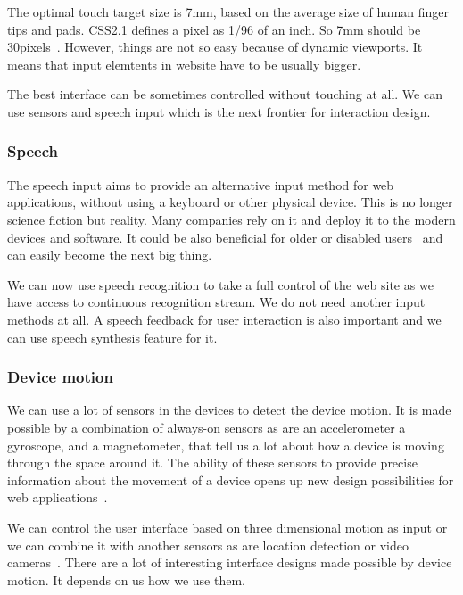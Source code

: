 \documentclass{iitsrc}
\begin{document}
The optimal touch target size is 7mm, based on the average size of human finger tips and pads. CSS2.1 defines a pixel as 1/96 of an inch. So 7mm should be 30pixels~\cite{designingfortouch}. However, things are not so easy because of dynamic viewports. It means that input elemtents in website have to be usually bigger.

The best interface can be sometimes controlled without touching at all. We can use sensors and speech input which is the next frontier for interaction design.


\subsubsection*{Speech} %
\label{sub:speech}

The speech input aims to provide an alternative input method for web applications, without using a keyboard or other physical device. This is no longer science fiction but reality. Many companies rely on it and deploy it to the modern devices and software. It could be also beneficial for older or disabled users~\cite{SpeechRecognition} and can easily become the next big thing.

We can now use speech recognition to take a full control of the web site as we have access to continuous recognition stream. We do not need another input methods at all. A speech feedback for user interaction is also important and we can use speech synthesis feature for it.


\subsubsection*{Device motion} %
\label{sub:device_motion}

We can use a lot of sensors in the devices to detect the device motion. It is made possible by a combination of always-on sensors as are an accelerometer a gyroscope, and a magnetometer, that tell us a lot about how a device is moving through the space around it. The ability of these sensors to provide precise information about the movement of a device opens up new design possibilities for web applications~\cite{ultrabooks}.

We can control the user interface based on three dimensional motion as input or we can combine it with another sensors as are location detection or video cameras~\cite{AccelerationAndGyroscope}. There are a lot of interesting interface designs made possible by device motion. It depends on us how we use them.
\end{document}
